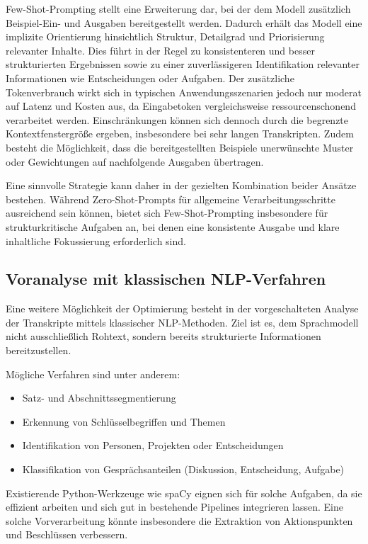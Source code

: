 Few-Shot-Prompting stellt eine Erweiterung dar, bei der dem Modell zusätzlich Beispiel-Ein- und Ausgaben bereitgestellt werden. Dadurch erhält das Modell eine implizite Orientierung hinsichtlich Struktur, Detailgrad und Priorisierung relevanter Inhalte. Dies führt in der Regel zu konsistenteren und besser strukturierten Ergebnissen sowie zu einer zuverlässigeren Identifikation relevanter Informationen wie Entscheidungen oder Aufgaben. Der zusätzliche Tokenverbrauch wirkt sich in typischen Anwendungsszenarien jedoch nur moderat auf Latenz und Kosten aus, da Eingabetoken vergleichsweise ressourcenschonend verarbeitet werden. Einschränkungen können sich dennoch durch die begrenzte Kontextfenstergröße ergeben, insbesondere bei sehr langen Transkripten. Zudem besteht die Möglichkeit, dass die bereitgestellten Beispiele unerwünschte Muster oder Gewichtungen auf nachfolgende Ausgaben übertragen.

Eine sinnvolle Strategie kann daher in der gezielten Kombination beider Ansätze bestehen. Während Zero-Shot-Prompts für allgemeine Verarbeitungsschritte ausreichend sein können, bietet sich Few-Shot-Prompting insbesondere für strukturkritische Aufgaben an, bei denen eine konsistente Ausgabe und klare inhaltliche Fokussierung erforderlich sind.

\subsection{Voranalyse mit klassischen NLP-Verfahren}
Eine weitere Möglichkeit der Optimierung besteht in der vorgeschalteten Analyse der Transkripte mittels klassischer NLP-Methoden. Ziel ist es, dem Sprachmodell nicht ausschließlich Rohtext, sondern bereits strukturierte Informationen bereitzustellen. 

Mögliche Verfahren sind unter anderem: 
\begin{itemize}
    \item Satz- und Abschnittssegmentierung
    \item Erkennung von Schlüsselbegriffen und Themen
    \item Identifikation von Personen, Projekten oder Entscheidungen
    \item Klassifikation von Gesprächsanteilen (Diskussion, Entscheidung, Aufgabe)
\end{itemize}

Existierende Python-Werkzeuge wie spaCy \cite{spacy} eignen sich für solche Aufgaben, da sie effizient arbeiten und sich gut in bestehende Pipelines integrieren lassen. Eine solche Vorverarbeitung könnte insbesondere die Extraktion von Aktionspunkten und Beschlüssen verbessern. 

